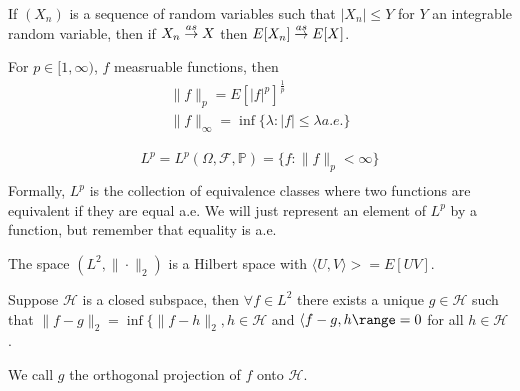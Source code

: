 \begin{thm}
  If $(X_{n})$ is a sequence of random variables such that $|X_{n}|
  \leq Y$ for $Y$ an integrable random variable, then if $X_{n} \overset{as}{\rightarrow}
  X$ then $E[X_{n}] \overset{as}{\rightarrow} E[X]$. 
\end{thm}

\begin{defn}
  \label{defn:9}
  For $p \in [1, \infty)$, $f$ measruable functions, then
  \begin{align}
    \| f \|_{p} = E[|f|^{p}]^{\frac{1}{p}} \\
    \| f \|_{\infty} = \inf \{ \lambda : |f| \leq \lambda a.e. \}
  \end{align}
\end{defn}

\begin{defn}
  \label{defn:10}
  \begin{align*}
    L^{p} = L^{p}(\Omega, \mathcal{F}, \mathbb{P}) = \{ f : \| f
    \|_{p} < \infty \} \\
  \end{align*}
  Formally, $L^{p}$ is the collection of equivalence classes where two
  functions are equivalent if they are equal a.e.  We will just
  represent an element of $L^{p}$ by a function, but remember that
  equality is a.e.
\end{defn}

\begin{thm}
  The space $(L^{2}, \| \cdot \|_{2})$ is a Hilbert space with
  $\langle U, V \rangle> = E[UV]$.

  Suppose $\mathcal{H}$ is a closed subspace, then $\forall f \in
  L^{2}$ there exists a unique $g \in \mathcal{H}$ such that $\| f - g
  \|_{2} = \inf \{ \| f- h \|_{2}, h \in \mathcal{H}$ and $\langle f
  -g, h \range = 0$ for all $h \in \mathcal{H}$.

  We call $g$ the orthogonal projection of $f$ onto $\mathcal{H}$.
\end{thm}

